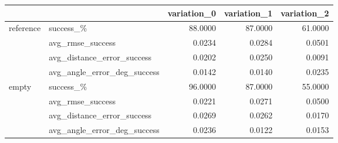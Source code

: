 \begin{tabular}{llrrr}
\toprule
 &  & variation_0 & variation_1 & variation_2 \\
\midrule
\multirow[t]{4}{*}{reference} & success_\% & 88.0000 & 87.0000 & 61.0000 \\
 & avg_rmse_success & 0.0234 & 0.0284 & 0.0501 \\
 & avg_distance_error_success & 0.0202 & 0.0250 & 0.0091 \\
 & avg_angle_error_deg_success & 0.0142 & 0.0140 & 0.0235 \\
\cline{1-5}
\multirow[t]{4}{*}{empty} & success_\% & 96.0000 & 87.0000 & 55.0000 \\
 & avg_rmse_success & 0.0221 & 0.0271 & 0.0500 \\
 & avg_distance_error_success & 0.0269 & 0.0262 & 0.0170 \\
 & avg_angle_error_deg_success & 0.0236 & 0.0122 & 0.0153 \\
\cline{1-5}
\bottomrule
\end{tabular}
